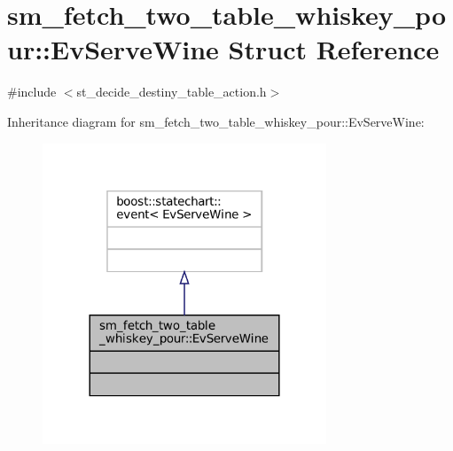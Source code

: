 \hypertarget{structsm__fetch__two__table__whiskey__pour_1_1EvServeWine}{}\section{sm\+\_\+fetch\+\_\+two\+\_\+table\+\_\+whiskey\+\_\+pour\+:\+:Ev\+Serve\+Wine Struct Reference}
\label{structsm__fetch__two__table__whiskey__pour_1_1EvServeWine}


{\ttfamily \#include $<$st\+\_\+decide\+\_\+destiny\+\_\+table\+\_\+action.\+h$>$}



Inheritance diagram for sm\+\_\+fetch\+\_\+two\+\_\+table\+\_\+whiskey\+\_\+pour\+:\+:Ev\+Serve\+Wine\+:
\nopagebreak
\begin{figure}[H]
\begin{center}
\leavevmode
\includegraphics[width=240pt]{structsm__fetch__two__table__whiskey__pour_1_1EvServeWine__inherit__graph}
\end{center}
\end{figure}


